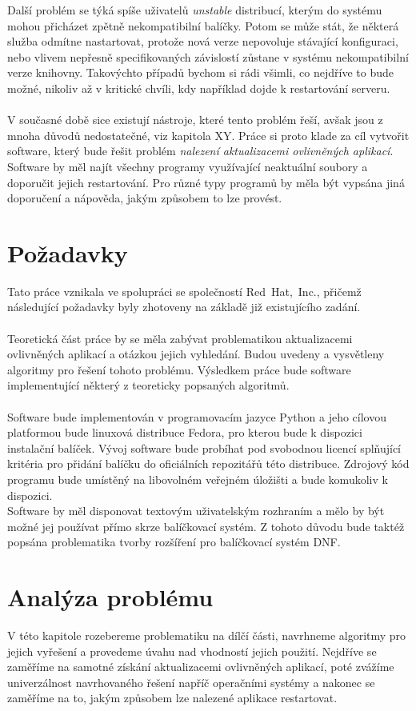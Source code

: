 \documentclass[
  field=inf,
  biblatex,
  glossaries,
  index
]{kidiplom}
\begin{document}
	Další problém se týká spíše uživatelů \textit{unstable} distribucí, kterým do systému mohou přicházet zpětně nekompatibilní balíčky. Potom se může stát, že některá služba odmítne nastartovat, protože nová verze nepovoluje stávající konfiguraci, nebo vlivem nepřesně specifikovaných závislostí zůstane v systému nekompatibilní verze knihovny. Takovýchto případů bychom si rádi všimli, co nejdříve to bude možné, nikoliv až v kritické chvíli, kdy například dojde k restartování serveru.
	\\
	\\
	V současné době sice existují nástroje, které tento problém řeší, avšak jsou z mnoha důvodů nedostatečné, viz kapitola XY. Práce si proto klade za cíl vytvořit software, který bude řešit problém \textit{nalezení aktualizacemi ovlivněných aplikací}. Software by měl najít všechny programy využívající neaktuální soubory a doporučit jejich restartování. Pro různé typy programů by měla být vypsána jiná doporučení a nápověda, jakým způsobem to lze provést.

	\section{Požadavky}
	Tato práce vznikala ve spolupráci se společností Red~Hat,~Inc., přičemž následující požadavky byly zhotoveny na základě již existujícího zadání.
	\\
	\\
	Teoretická část práce by se měla zabývat problematikou aktualizacemi ovlivněných aplikací a otázkou jejich vyhledání. Budou uvedeny a vysvětleny algoritmy pro řešení tohoto problému. Výsledkem práce bude software implementující některý z teoreticky popsaných algoritmů.
	\\
	\\
	Software bude implementován v programovacím jazyce Python a jeho cílovou platformou bude linuxová distribuce Fedora, pro kterou bude k dispozici instalační balíček. Vývoj software bude probíhat pod svobodnou licencí splňující kritéria pro přidání balíčku do oficiálních repozitářů této distribuce. Zdrojový kód programu bude umístěný na libovolném veřejném úložišti a bude komukoliv k dispozici.
	\\
	Software by měl disponovat textovým uživatelským rozhraním a mělo by být možné jej používat přímo skrze balíčkovací systém. Z tohoto důvodu bude taktéž popsána problematika tvorby rozšíření pro balíčkovací systém DNF\@.

\section{Analýza problému}
V této kapitole rozebereme problematiku na dílčí části, navrhneme algoritmy pro jejich vyřešení a provedeme úvahu nad vhodností jejich použití. Nejdříve se zaměříme na samotné získání aktualizacemi ovlivněných aplikací, poté zvážíme univerzálnost navrhovaného řešení napříč operačními systémy a nakonec se zaměříme na to, jakým způsobem lze nalezené aplikace restartovat.
\end{document}
